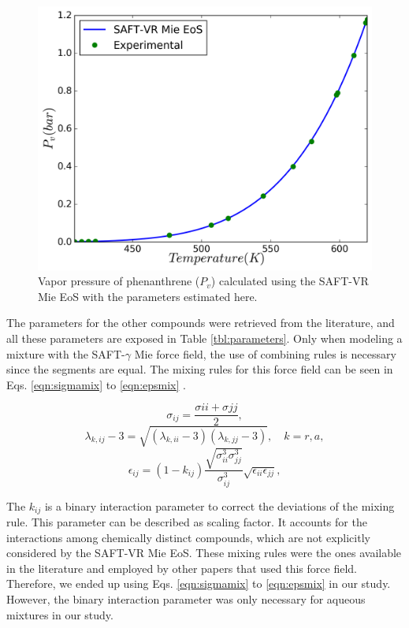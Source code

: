\documentclass[final,12p,times,twocolumn]{elsarticle}
\begin{document}
		\begin{figure}[h]
            \raggedleft
			\includegraphics[width=1.0\linewidth]{Figures/eos}
			\caption{Vapor pressure of phenanthrene ($P_{v}$) calculated using the SAFT-VR Mie EoS with the parameters estimated here.}
			\label{fig:edefit}
		\end{figure}
	
	The parameters for the other compounds were retrieved from the literature, and all these parameters are exposed in Table \ref{tbl:parameters}. Only when modeling a mixture with the SAFT-$\gamma$ Mie force field, the use of combining rules is necessary since the segments are equal. The mixing  rules for  this force field can be seen in Eqs. \ref{eqn:sigmamix} to \ref{eqn:epsmix} \cite{lafitte2013}.
	
	\begin{equation}
	\sigma_{ij} =\frac{\sigma{ii}+\sigma{jj}}{2},
	\label{eqn:sigmamix}
	\end{equation}
	\begin{equation}
	\lambda_{k,ij} -3 =\sqrt{(\lambda_{k,ii}-3)(\lambda_{k,jj}-3)}, \quad k=r,a,
	\label{eqn:lambdamix}
	\end{equation}
	\begin{equation}
	\label{eqn:epsmix}
	\epsilon_{ij} =(1-k_{ij})\frac{\sqrt{\sigma_{ii}^{3}\sigma_{jj}^{3}}}{\sigma_{ij}^{3}}\sqrt{\epsilon_{ii}\epsilon_{jj}},
	\end{equation}
	
    The $k_{ij}$ is a binary interaction parameter to correct the deviations of the mixing rule. This parameter can be described as scaling factor. It accounts for the interactions among chemically distinct compounds, which are not explicitly considered by the SAFT-VR Mie EoS. These mixing rules were the ones available in the literature and employed by other papers that used this force field. Therefore, we ended up using Eqs. \ref{eqn:sigmamix} to \ref{eqn:epsmix} in our study. However, the binary interaction parameter was only necessary for aqueous mixtures in our study.   
 
\end{document}
